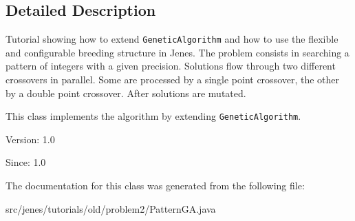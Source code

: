 \subsection{Detailed Description}
Tutorial showing how to extend {\tt GeneticAlgorithm} and how to use the flexible and configurable breeding structure in Jenes. The problem consists in searching a pattern of integers with a given precision. Solutions flow through two different crossovers in parallel. Some are processed by a single point crossover, the other by a double point crossover. After solutions are mutated.

This class implements the algorithm by extending {\tt GeneticAlgorithm}.

\begin{Desc}
\item[Version:]1.0\end{Desc}
\begin{Desc}
\item[Since:]1.0 \end{Desc}


The documentation for this class was generated from the following file:\begin{CompactItemize}
\item 
src/jenes/tutorials/old/problem2/PatternGA.java\end{CompactItemize}
